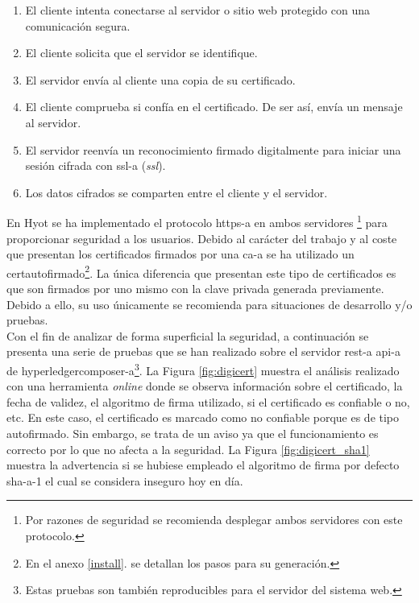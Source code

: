 \documentclass[12pt,a4paper, twoside]{report}
\begin{document}
	\begin{enumerate}
		\item El cliente intenta conectarse al servidor o sitio web protegido con una comunicación segura.
		\item El cliente solicita que el servidor se identifique.
		\item El servidor envía al cliente una copia de su certificado. 
		\item El cliente comprueba si confía en el certificado. De ser así, envía un mensaje al servidor.
		\item El servidor reenvía un reconocimiento firmado digitalmente para iniciar una sesión cifrada con \gls{ssl-a} (\textit{\gls{ssl}}).
		\item Los datos cifrados se comparten entre el cliente y el servidor.
	\end{enumerate}

	En Hyot se ha implementado el protocolo \gls{https-a} en ambos servidores \footnote{Por razones de seguridad se recomienda desplegar ambos servidores con este protocolo.} para proporcionar seguridad a los usuarios. Debido al carácter del trabajo y al coste que presentan los certificados firmados por una \gls{ca-a} se ha utilizado un \gls{certautofirmado}\footnote{En el anexo \ref{install}.  se detallan los pasos para su generación.}. La única diferencia que presentan este tipo de certificados es que son firmados por uno mismo con la clave privada generada previamente. Debido a ello, su uso únicamente se recomienda para situaciones de desarrollo y/o pruebas. \\

	Con el fin de analizar de forma superficial la seguridad, a continuación se presenta una serie de pruebas que se han realizado sobre el servidor \gls{rest-a} \gls{api-a} de \gls{hyperledgercomposer-a}\footnote{Estas pruebas son también reproducibles para el servidor del sistema web.}. La Figura \ref{fig:digicert} muestra el análisis realizado con una herramienta \textit{online} donde se observa información sobre el certificado, la fecha de validez, el algoritmo de firma utilizado, si el certificado es confiable o no, etc. En este caso, el certificado es marcado como no confiable porque es de tipo autofirmado. Sin embargo, se trata de un aviso ya que el funcionamiento es correcto por lo que no afecta a la seguridad. La Figura \ref{fig:digicert_sha1} muestra la advertencia si se hubiese empleado el algoritmo de firma por defecto \gls{sha-a}-1 el cual se considera inseguro hoy en día.	
		
\end{document}
